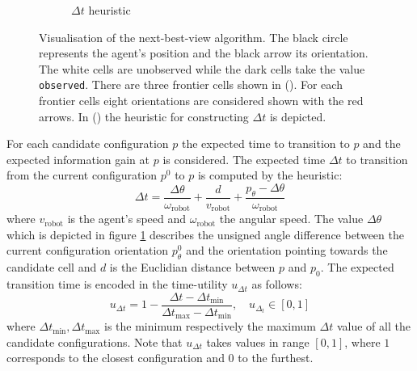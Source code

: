 \begin{figure}
\begin{subfigure}[b]{0.48\textwidth}
        \caption{$\Delta t$ heuristic}
        \label{subfig:baseline_b}
    \end{subfigure}
    \caption{Visualisation of the next-best-view algorithm. The black circle represents the agent's position and the black arrow its orientation. The white cells are unobserved while the dark cells take the value \texttt{observed}. There are three frontier cells shown in (). For each frontier cells eight orientations are considered shown with the red arrows. In () the heuristic for constructing $\Delta t$ is depicted.}
    \label{fig:baseline}
\end{figure}

For each candidate configuration $p$ the expected time to transition to $p$ and the expected information gain at $p$ is considered. The expected time $\Delta t$ to transition from the current configuration $p^0$ to $p$ is computed by the heuristic:
%
\begin{equation}
    \Delta t = \frac{\Delta\theta}{\omega_\text{robot}} +    \frac{d}{v_\text{robot}} + \frac{p_\theta - \Delta\theta}{\omega_\text{robot}}
\end{equation}
%
where $v_\text{robot}$ is the agent's speed and $\omega_\text{robot}$ the angular speed. The value $\Delta\theta$ which is depicted in figure \ref{subfig:baseline_b} describes the unsigned angle difference between the current configuration orientation $p_\theta^0$ and the orientation pointing towards the candidate cell and $d$ is the Euclidian distance between $p$ and $p_0$. The expected transition time is encoded in the time-utility $u_{\Delta t}$ as follows:
%
\begin{equation}
    u_{\Delta t} = 1 - \frac{\Delta t - \Delta t_{\text{min}}}{\Delta t_\text{max}-\Delta t_\text{min}}, \quad u_{\Delta_t}\in [0, 1]
\end{equation}
where $\Delta t_\text{min}, \Delta t_\text{max}$ is the minimum respectively the maximum $\Delta t$ value of all the candidate configurations. Note that $u_{\Delta t}$ takes values in range $[0, 1]$, where $1$ corresponds to the closest configuration and $0$ to the furthest.\\

